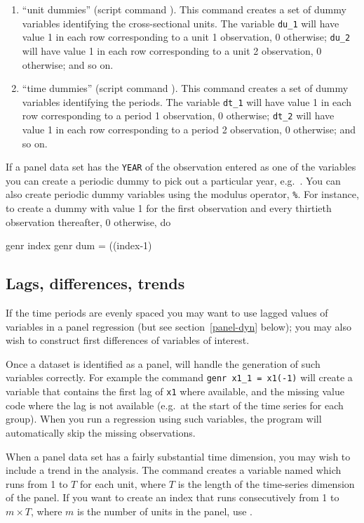 \begin{enumerate}
\item ``unit dummies'' (script command ).  This
  command creates a set of dummy variables identifying the
  cross-sectional units.  The variable \verb+du_1+ will have value 1
  in each row corresponding to a unit 1 observation, 0 otherwise;
  \verb+du_2+ will have value 1 in each row corresponding to a unit 2
  observation, 0 otherwise; and so on.
\item ``time dummies'' (script command ).  This
  command creates a set of dummy variables identifying the periods.
  The variable \verb+dt_1+ will have value 1 in each row
  corresponding to a period 1 observation, 0 otherwise; \verb+dt_2+
  will have value 1 in each row corresponding to a period 2
  observation, 0 otherwise; and so on.
\end{enumerate}

If a panel data set has the \verb+YEAR+ of the observation entered as
one of the variables you can create a periodic dummy to pick out a
particular year, e.g.\ .  You can also
create periodic dummy variables using the modulus operator,
\verb+%+.  For instance, to create a dummy with
value 1 for the first observation and every thirtieth observation
thereafter, 0 otherwise, do
\begin{code}
      genr index 
      genr dum = ((index-1)%
\end{code}

\subsection{Lags, differences, trends}
\label{panel-lagged}

If the time periods are evenly spaced you may want to use lagged
values of variables in a panel regression (but see
section~\ref{panel-dyn} below); you may also wish to construct first
differences of variables of interest.

Once a dataset is identified as a panel,  will handle the
generation of such variables correctly.  For example the command
\verb+genr x1_1 = x1(-1)+ will create a variable that contains the
first lag of \verb+x1+ where available, and the missing value code
where the lag is not available (e.g.\ at the start of the time series
for each group).  When you run a regression using such variables, the
program will automatically skip the missing observations.

When a panel data set has a fairly substantial time dimension, you may
wish to include a trend in the analysis.  The command  
creates a variable named  which runs from 1 to $T$ for
each unit, where $T$ is the length of the time-series dimension of the
panel.  If you want to create an index that runs consecutively from 1
to $m\times T$, where $m$ is the number of units in the panel, use
.


